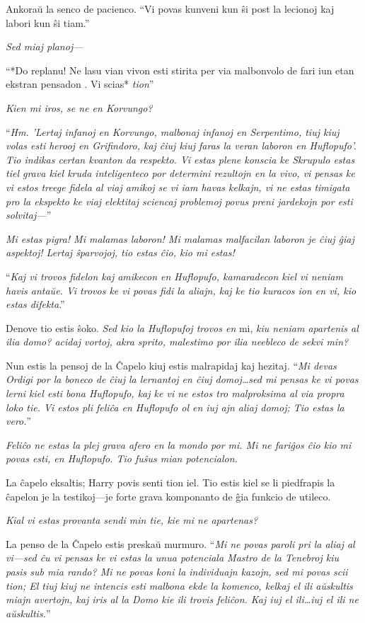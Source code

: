 Ankoraŭ la senco de pacienco. ``Vi povas kunveni kun ŝi post la lecionoj
kaj labori kun ŝi tiam.''

\emph{Sed miaj planoj—}

``*Do replanu! Ne lasu vian vivon esti stirita per via malbonvolo de
fari iun etan ekstran pensadon . Vi scias* \emph{tion}''

\emph{Kien mi iros, se ne en Korvungo?}

``\emph{Hm. 'Lertaj infanoj en Korvungo, malbonaj infanoj en
  Serpentimo, tiuj kiuj volas esti herooj en Grifindoro, kaj ĉiuj kiuj
  faras la veran laboron en Huflopufo'. Tio indikas certan kvanton da
  respekto. Vi estas plene konscia ke Skrupulo estas tiel grava kiel
  kruda inteligenteco por determini rezultojn en la vivo, vi pensas ke
  vi estos treege fidela al viaj amikoj se vi iam havas kelkajn, vi ne
  estas timigata pro la ekspekto ke viaj elektitaj sciencaj problemoj
  povus preni jardekojn por esti solvitaj—}''

\emph{Mi estas pigra! Mi malamas laboron! Mi malamas malfacilan
  laboron je ĉiuj ĝiaj aspektoj! Lertaj ŝparvojoj, tio estas ĉio, kio
  mi estas!}

``\emph{Kaj vi trovos fidelon kaj amikecon en Huflopufo, kamaradecon
  kiel vi neniam havis antaŭe. Vi trovos ke vi povas fidi la aliajn,
  kaj ke tio kuracos ion en vi, kio estas difekta}.''

Denove tio estis ŝoko. \emph{Sed kio la Huflopufoj trovos en} mi,
\emph{kiu neniam apartenis al ilia domo? acidaj vortoj, akra sprito,
  malestimo por ilia neebleco de sekvi min?}

Nun estis la pensoj de la Ĉapelo kiuj estis malrapidaj kaj
hezitaj. ``\emph{Mi devas Ordigi por la boneco de ĉiuj la lernantoj en
  ĉiuj domoj\ldots sed mi pensas ke vi povas lerni kiel esti bona
  Huflopufo, kaj ke vi ne estos tro malproksima al via propra loko
  tie. Vi estos pli feliĉa en Huflopufo ol en iuj ajn aliaj domoj; Tio
  estas la vero.}''

\emph{Feliĉo ne estas la plej grava afero en la mondo por mi. Mi ne
  fariĝos ĉio kio mi povas esti, en Huflopufo. Tio fuŝus mian
  potencialon.}

La ĉapelo eksaltis; Harry povis senti tion iel. Tio estis kiel se li
piedfrapis la ĉapelon je la testikoj—je forte grava komponanto de ĝia
funkcio de utileco.

\emph{Kial vi estas provanta sendi min tie, kie mi ne apartenas?}

La penso de la Ĉapelo estis preskaŭ murmuro. ``\emph{Mi ne povas
  paroli pri la aliaj al vi—sed ĉu vi pensas ke vi estas la unua
  potenciala Mastro de la Tenebroj kiu pasis sub mia rando? Mi ne
  povas koni la individuajn kazojn, sed mi povas scii tion; El tiuj
  kiuj ne intencis esti malbona ekde la komenco, kelkaj el ili
  aŭskultis miajn avertojn, kaj iris al la Domo kie ili trovis
  feliĉon. Kaj iuj el ili\ldots iuj el ili ne aŭskultis.}''

